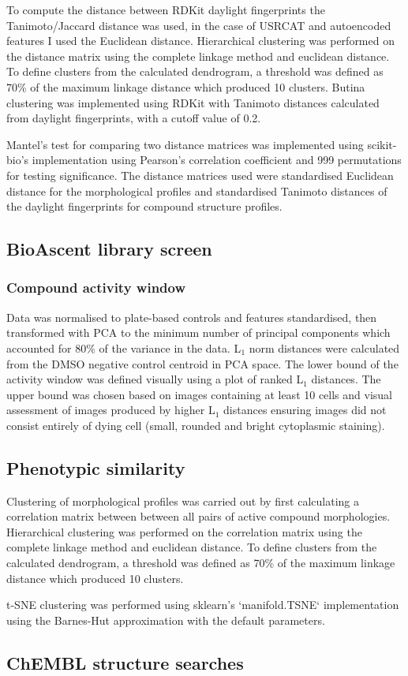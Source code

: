 \documentclass[a4paper,11pt,twoside,openright]{scrbook}
\begin{document}
To compute the distance between RDKit daylight fingerprints the Tanimoto/Jaccard distance was used, in the case of USRCAT and autoencoded features I used the Euclidean distance.
Hierarchical clustering was performed on the distance matrix using the complete linkage method and euclidean distance.
To define clusters from the calculated dendrogram, a threshold was defined as 70\% of the maximum linkage distance which produced 10 clusters.
Butina clustering was implemented using RDKit with Tanimoto distances calculated from daylight fingerprints, with a cutoff value of 0.2.

Mantel's test for comparing two distance matrices was implemented using scikit-bio's implementation using Pearson's correlation coefficient and 999 permutations for testing significance.
The distance matrices used were standardised Euclidean distance for the morphological profiles and standardised Tanimoto distances of the daylight fingerprints for compound structure profiles.


\subsection{BioAscent library screen}

\subsubsection{Compound activity window}
Data was normalised to plate-based controls and features standardised, then transformed with PCA to the minimum number of principal components which accounted for 80\% of the variance in the data.
L$_1$ norm distances were calculated from the DMSO negative control centroid in PCA space.
The lower bound of the activity window was defined visually using a plot of ranked L$_1$ distances.
The upper bound was chosen based on images containing at least 10 cells and visual assessment of images produced by higher L$_1$ distances ensuring images did not consist entirely of dying cell (small, rounded and bright cytoplasmic staining).


\subsection{Phenotypic similarity}
Clustering of morphological profiles was carried out by first calculating a correlation matrix between between all pairs of active compound morphologies.
Hierarchical clustering was performed on the correlation matrix using the complete linkage method and euclidean distance.
To define clusters from the calculated dendrogram, a threshold was defined as 70\% of the maximum linkage distance which produced 10 clusters.


t-SNE clustering was performed using sklearn's `manifold.TSNE` implementation using the Barnes-Hut approximation with the default parameters.

\subsection{ChEMBL structure searches}


\end{document}
